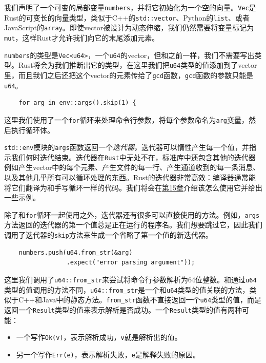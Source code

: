 我们声明了一个可变的局部变量\texttt{numbers}，并将它初始化为一个空的向量。\texttt{Vec}是Rust的可变长的向量类型，类似于C++的\texttt{std::vector}、Python的\texttt{list}、或者JavaScript的\texttt{array}。即使vector被设计为动态伸缩，我们仍然需要将变量标记为\texttt{mut}，这样Rust才允许我们向它的末尾添加元素。

\texttt{numbers}的类型是\texttt{Vec<u64>}，一个\texttt{u64}的vector，但和之前一样，我们不需要写出类型。Rust将会为我们推断出它的类型，在这里我们把\texttt{u64}类型的值添加到了vector里，而且我们之后还把这个vector的元素传给了\texttt{gcd}函数，\texttt{gcd}函数的参数只能是\texttt{u64}。

\begin{verbatim}
    for arg in env::args().skip(1) {
\end{verbatim}

这里我们使用了一个\texttt{for}循环来处理命令行参数，将每个参数命名为\texttt{arg}变量，然后执行循环体。

\texttt{std::env}模块的\texttt{args}函数返回一个\emph{迭代器}，迭代器可以惰性产生每一个值，并指示我们何时迭代结束。迭代器在\texttt{Rust}中无处不在，标准库中还包含其他的迭代器例如产生vector中的每个元素、产生文件的每一行、产生通道收到的每一条消息、以及其他几乎所有可以循环处理的东西。Rust的迭代器非常高效：编译器通常能将它们翻译为和手写循环一样的代码。我们将会在\hyperref[ch15]{第15章}介绍该怎么使用它并给出一些示例。

除了和\texttt{for}循环一起使用之外，迭代器还有很多可以直接使用的方法。例如，\texttt{args}方法返回的迭代器的第一个值总是正在运行的程序名。我们想要跳过它，因此我们调用了迭代器的\texttt{skip}方法来生成一个省略了第一个值的新迭代器。

\begin{verbatim}
    numbers.push(u64.from_str(&arg)
                 .expect("error parsing argument"));
\end{verbatim}

这里我们调用了\texttt{u64::from\_str}来尝试将命令行参数解析为64位整数。和通过\texttt{u64}类型的值调用的方法不同，\texttt{u64::from\_str}是一个和\texttt{u64}类型的值关联的方法，类似于C++和Java中的静态方法。\texttt{from\_str}函数不直接返回一个\texttt{u64}类型的值，而是返回一个\texttt{Result}类型的值来表示解析是否成功。一个\texttt{Result}类型的值有两种可能：

\begin{itemize}
    \item 一个写作\texttt{Ok(v)}，表示解析成功，\texttt{v}就是解析出的值。
    \item 另一个写作\texttt{Err(e)}，表示解析失败，\texttt{e}是解释失败的原因。
\end{itemize}

